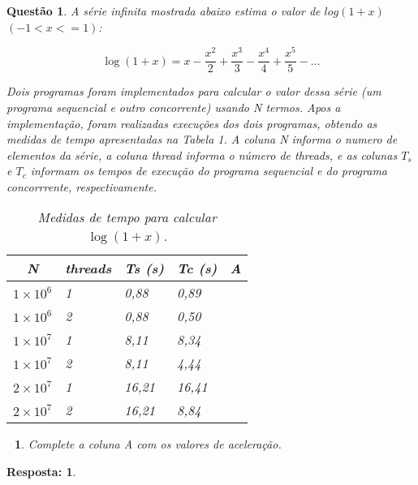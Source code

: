 \documentclass[a4paper, 12pt]{article}
\newtheorem{question}{Questão}
\newtheorem{questioni}{$\,\,$}[question]
\theoremstyle{dotless}
\newtheorem*{answer}{\textbf{Resposta:}}
\begin{document}
\begin{question}
    A série infinita mostrada abaixo estima o valor de $log(1+x)$ $(-1 < x <=1)$:

    \[\log{(1 + x)} = x - \frac{x^2}{2} + \frac{x^3}{3} - \frac{x^4}{4} + \frac{x^5}{5} - \dots\]

    Dois programas foram implementados para calcular o valor dessa série (um programa sequencial e outro concorrente) usando N termos. Apos a implementação, foram realizadas execuções dos dois programas, obtendo as medidas de tempo apresentadas na Tabela 1. A coluna N informa o numero de elementos da série, a coluna thread informa o número de threads, e as colunas $T_s$ e $T_c$ informam os tempos de execução do programa sequencial e do programa concorrrente, respectivamente.

    \begin{table}[h!]
        \centering
        \begin{tabular}{|c|l|l|l|l|}
            \hline
            N               & threads & Ts (s) & Tc (s) & A \\
            \hline
            $1 \times 10^6$ & 1       & 0,88   & 0,89   &   \\
            \hline
            $1 \times 10^6$ & 2       & 0,88   & 0,50   &   \\
            \hline
            $1 \times 10^7$ & 1       & 8,11   & 8,34   &   \\
            \hline
            $1 \times 10^7$ & 2       & 8,11   & 4,44   &   \\
            \hline
            $2 \times 10^7$ & 1       & 16,21  & 16,41  &   \\
            \hline
            $2 \times 10^7$ & 2       & 16,21  & 8,84   &   \\
            \hline
        \end{tabular}
        \caption{Medidas de tempo para calcular $\log{(1+x)}$.}
    \end{table}
\end{question}

\begin{questioni}
    Complete a coluna A com os valores de aceleração.
\end{questioni}
\begin{answer}
\end{answer}
\end{document}
